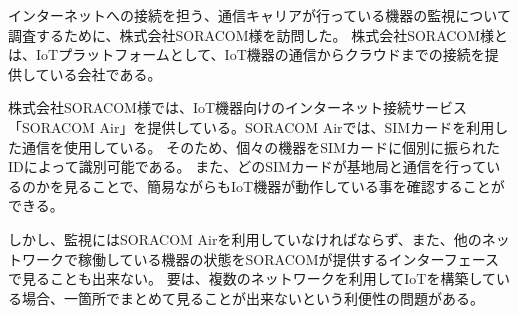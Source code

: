 
インターネットへの接続を担う、通信キャリアが行っている機器の監視について調査するために、株式会社SORACOM様を訪問した。
株式会社SORACOM様とは、IoTプラットフォームとして、IoT機器の通信からクラウドまでの接続を提供している会社である。

株式会社SORACOM様では、IoT機器向けのインターネット接続サービス「SORACOM Air」を提供している。SORACOM Airでは、SIMカードを利用した通信を使用している。
そのため、個々の機器をSIMカードに個別に振られたIDによって識別可能である。
また、どのSIMカードが基地局と通信を行っているのかを見ることで、簡易ながらもIoT機器が動作している事を確認することができる。

しかし、監視にはSORACOM Airを利用していなければならず、また、他のネットワークで稼働している機器の状態をSORACOMが提供するインターフェースで見ることも出来ない。
要は、複数のネットワークを利用してIoTを構築している場合、一箇所でまとめて見ることが出来ないという利便性の問題がある。

